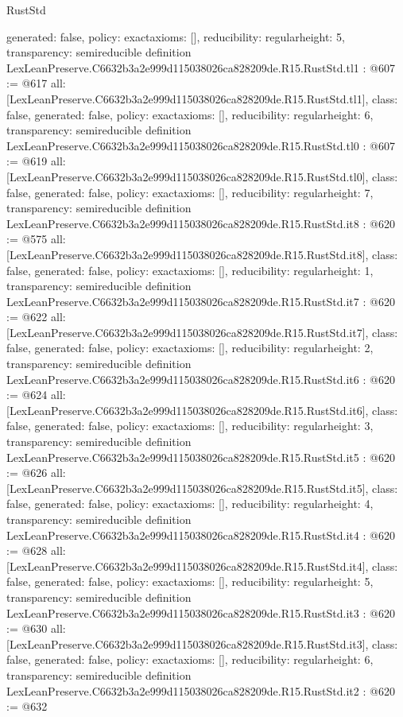\begin{lexlean}{RustStd}
\begin{coremodule}
{  generated: false,
  policy: exact{axioms: []},
  reducibility: regular{height: 5},
  transparency: semireducible
}
definition LexLeanPreserve.C6632b3a2e999d115038026ca828209de.R15.RustStd.tl1 : @607 := @617 {
  all: [LexLeanPreserve.C6632b3a2e999d115038026ca828209de.R15.RustStd.tl1],
  class: false,
  generated: false,
  policy: exact{axioms: []},
  reducibility: regular{height: 6},
  transparency: semireducible
}
definition LexLeanPreserve.C6632b3a2e999d115038026ca828209de.R15.RustStd.tl0 : @607 := @619 {
  all: [LexLeanPreserve.C6632b3a2e999d115038026ca828209de.R15.RustStd.tl0],
  class: false,
  generated: false,
  policy: exact{axioms: []},
  reducibility: regular{height: 7},
  transparency: semireducible
}
definition LexLeanPreserve.C6632b3a2e999d115038026ca828209de.R15.RustStd.it8 : @620 := @575 {
  all: [LexLeanPreserve.C6632b3a2e999d115038026ca828209de.R15.RustStd.it8],
  class: false,
  generated: false,
  policy: exact{axioms: []},
  reducibility: regular{height: 1},
  transparency: semireducible
}
definition LexLeanPreserve.C6632b3a2e999d115038026ca828209de.R15.RustStd.it7 : @620 := @622 {
  all: [LexLeanPreserve.C6632b3a2e999d115038026ca828209de.R15.RustStd.it7],
  class: false,
  generated: false,
  policy: exact{axioms: []},
  reducibility: regular{height: 2},
  transparency: semireducible
}
definition LexLeanPreserve.C6632b3a2e999d115038026ca828209de.R15.RustStd.it6 : @620 := @624 {
  all: [LexLeanPreserve.C6632b3a2e999d115038026ca828209de.R15.RustStd.it6],
  class: false,
  generated: false,
  policy: exact{axioms: []},
  reducibility: regular{height: 3},
  transparency: semireducible
}
definition LexLeanPreserve.C6632b3a2e999d115038026ca828209de.R15.RustStd.it5 : @620 := @626 {
  all: [LexLeanPreserve.C6632b3a2e999d115038026ca828209de.R15.RustStd.it5],
  class: false,
  generated: false,
  policy: exact{axioms: []},
  reducibility: regular{height: 4},
  transparency: semireducible
}
definition LexLeanPreserve.C6632b3a2e999d115038026ca828209de.R15.RustStd.it4 : @620 := @628 {
  all: [LexLeanPreserve.C6632b3a2e999d115038026ca828209de.R15.RustStd.it4],
  class: false,
  generated: false,
  policy: exact{axioms: []},
  reducibility: regular{height: 5},
  transparency: semireducible
}
definition LexLeanPreserve.C6632b3a2e999d115038026ca828209de.R15.RustStd.it3 : @620 := @630 {
  all: [LexLeanPreserve.C6632b3a2e999d115038026ca828209de.R15.RustStd.it3],
  class: false,
  generated: false,
  policy: exact{axioms: []},
  reducibility: regular{height: 6},
  transparency: semireducible
}
definition LexLeanPreserve.C6632b3a2e999d115038026ca828209de.R15.RustStd.it2 : @620 := @632 {
}
\end{coremodule}
\end{lexlean}
